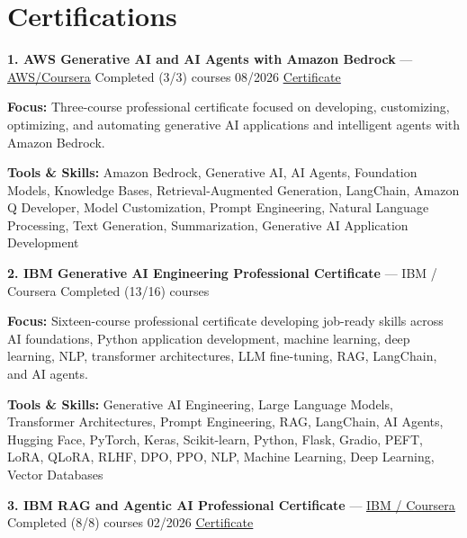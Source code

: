 \documentclass[9pt,letterpaper]{extarticle}
\begin{document}
\section{Certifications}
\noindent\textbf{1. AWS Generative AI and AI Agents with Amazon Bedrock} {\small --- \textcolor{blue}{\underline{\href{https://coursera.org/verify/professional-cert/XMNOUZNOW9M0}{AWS/Coursera}}} \textbar{} Completed (3/3) courses \textbar{} 08/2026 \textbar{} \textcolor{blue}{\underline{\href{https://waseemraza844.github.io/portfolio/certificates/genai/aws-bedrock/aws-generative-ai-agents-amazon-bedrock.pdf}{Certificate}}}}\par
\textbf{Focus:} Three-course professional certificate focused on developing, customizing, optimizing, and automating generative AI applications and intelligent agents with Amazon Bedrock.\par
{\small\textbf{Tools \& Skills:} Amazon Bedrock, Generative AI, AI Agents, Foundation Models, Knowledge Bases, Retrieval-Augmented Generation, LangChain, Amazon Q Developer, Model Customization, Prompt Engineering, Natural Language Processing, Text Generation, Summarization, Generative AI Application Development\par}
\vspace{2pt}
\noindent\textbf{2. IBM Generative AI Engineering Professional Certificate} {\small --- IBM / Coursera \textbar{} Completed (13/16) courses}\par
\textbf{Focus:} Sixteen-course professional certificate developing job-ready skills across AI foundations, Python application development, machine learning, deep learning, NLP, transformer architectures, LLM fine-tuning, RAG, LangChain, and AI agents.\par
{\small\textbf{Tools \& Skills:} Generative AI Engineering, Large Language Models, Transformer Architectures, Prompt Engineering, RAG, LangChain, AI Agents, Hugging Face, PyTorch, Keras, Scikit-learn, Python, Flask, Gradio, PEFT, LoRA, QLoRA, RLHF, DPO, PPO, NLP, Machine Learning, Deep Learning, Vector Databases\par}
\vspace{2pt}
\noindent\textbf{3. IBM RAG and Agentic AI Professional Certificate} {\small --- \textcolor{blue}{\underline{\href{https://coursera.org/verify/professional-cert/0CB713GHZC1B}{IBM / Coursera}}} \textbar{} Completed (8/8) courses \textbar{} 02/2026 \textbar{} \textcolor{blue}{\underline{\href{https://waseemraza844.github.io/portfolio/certificates/genai/ibm-rag-agentic-ai/ibm-rag-agentic-ai-professional-certificate.pdf}{Certificate}}}}\par
\end{document}
